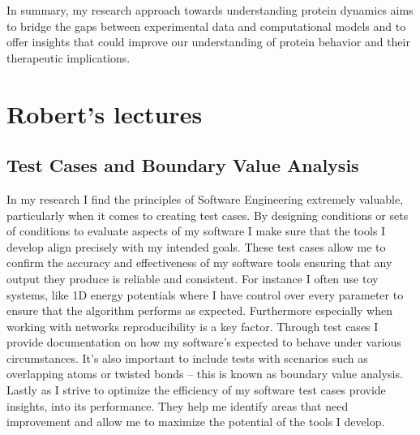 \documentclass[11pt,a4paper]{article}
\begin{document}
In summary, my research approach towards understanding protein dynamics aims to bridge the gaps between experimental data and computational models and to offer insights that could improve our understanding of protein behavior and their therapeutic implications.




\section{Robert's lectures}

\subsection{Test Cases and Boundary Value Analysis}
In my research I find the principles of Software Engineering extremely valuable, particularly when it comes to creating test cases. By designing conditions or sets of conditions to evaluate aspects of my software I make sure that the tools I develop align precisely with my intended goals. These test cases allow me to confirm the accuracy and effectiveness of my software tools ensuring that any output they produce is reliable and consistent. For instance I often use toy systems, like 1D energy potentials where I have control over every parameter to ensure that the algorithm performs as expected.
Furthermore especially when working with networks reproducibility is a key factor. Through test cases I provide documentation on how my software's expected to behave under various circumstances. It's also important to include tests with scenarios such as overlapping atoms or twisted bonds – this is known as boundary value analysis.
Lastly as I strive to optimize the efficiency of my software test cases provide insights, into its performance. They help me identify areas that need improvement and allow me to maximize the potential of the tools I develop.
\end{document}
